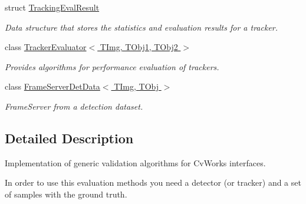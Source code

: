 \begin{DoxyCompactItemize}
struct \hyperlink{struct_vision_core_1_1_evaluation_1_1_tracking_eval_result}{Tracking\+Eval\+Result}
\begin{DoxyCompactList}\small\item\em Data structure that stores the statistics and evaluation results for a tracker. \end{DoxyCompactList}\item 
class \hyperlink{class_vision_core_1_1_evaluation_1_1_tracker_evaluator}{Tracker\+Evaluator$<$ T\+Img, T\+Obj1, T\+Obj2 $>$}
\begin{DoxyCompactList}\small\item\em Provides algorithms for performance evaluation of trackers. \end{DoxyCompactList}\item 
class \hyperlink{class_vision_core_1_1_evaluation_1_1_frame_server_det_data}{Frame\+Server\+Det\+Data$<$ T\+Img, T\+Obj $>$}
\begin{DoxyCompactList}\small\item\em Frame\+Server from a detection dataset. \end{DoxyCompactList}\end{DoxyCompactItemize}


\subsection{Detailed Description}
Implementation of generic validation algorithms for Cv\+Works interfaces. 

In order to use this evaluation methods you need a detector (or tracker) and a set of samples with the ground truth. 